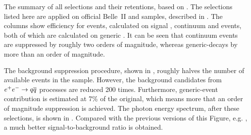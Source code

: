 \begin{table}[hbtp!]
    \centering
    \caption{\label{tab:cutflow} The summary of all selections and their retentions, based on .
    The selections listed here are applied on official Belle~II \feiBp and \feiBz samples, described in .
    The columns show efficiency for \BtoXsgamma events, calculated on signal \MC, continuum and \BB events, both of which are calculated on generic \MC.
    It can be seen that continuum events are suppressed by roughly two orders of magnitude, whereas generic-\BB decays by more than an order of magnitude.
    }
    
\end{table}

The background suppression procedure, shown in , roughly halves the number of available \BtoXsgamma events in the sample.
However, the background candidates from \mbox{$e^+e^-\rightarrow q\overline q$} processes are reduced 200 times.
Furthermore, generic-\BB event contribution is estimated at 7\% of the original, which means more that an order of magnitude suppression is achieved.
The photon energy spectrum, after these selections, is shown in .
Compared with the previous versions of this Figure, e.g. , a much better signal-to-background ratio is obtained.

